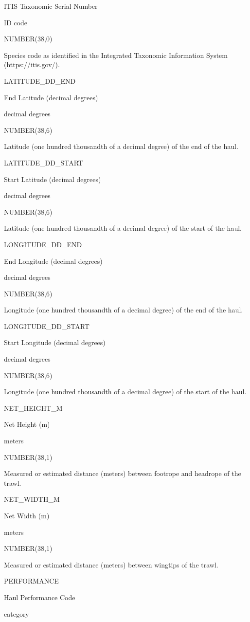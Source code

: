 \documentclass[
  letterpaper,
  oneside,
  open=any]{scrbook}
\begin{document}
ITIS Taxonomic Serial Number

ID code

NUMBER(38,0)

Species code as identified in the Integrated Taxonomic Information
System (https://itis.gov/).

LATITUDE\_DD\_END

End Latitude (decimal degrees)

decimal degrees

NUMBER(38,6)

Latitude (one hundred thousandth of a decimal degree) of the end of the
haul.

LATITUDE\_DD\_START

Start Latitude (decimal degrees)

decimal degrees

NUMBER(38,6)

Latitude (one hundred thousandth of a decimal degree) of the start of
the haul.

LONGITUDE\_DD\_END

End Longitude (decimal degrees)

decimal degrees

NUMBER(38,6)

Longitude (one hundred thousandth of a decimal degree) of the end of the
haul.

LONGITUDE\_DD\_START

Start Longitude (decimal degrees)

decimal degrees

NUMBER(38,6)

Longitude (one hundred thousandth of a decimal degree) of the start of
the haul.

NET\_HEIGHT\_M

Net Height (m)

meters

NUMBER(38,1)

Measured or estimated distance (meters) between footrope and headrope of
the trawl.

NET\_WIDTH\_M

Net Width (m)

meters

NUMBER(38,1)

Measured or estimated distance (meters) between wingtips of the trawl.

PERFORMANCE

Haul Performance Code

category
\end{document}
